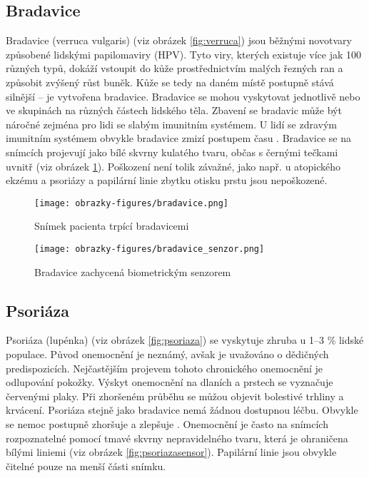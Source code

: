 \subsection{Bradavice}
Bradavice (verruca vulgaris) (viz obrázek \ref{fig:verruca}) jsou běžnými novotvary způsobené lidskými papilomaviry (HPV). Tyto viry, kterých existuje více jak 100 různých typů, dokáží vstoupit do kůže prostřednictvím malých řezných ran a způsobit zvýšený růst buněk. Kůže se tedy na daném místě postupně stává silnější -- je vytvořena bradavice. Bradavice se mohou vyskytovat jednotlivě nebo ve skupinách na různých částech lidského těla. Zbavení se bradavic může být náročné zejména pro lidi se slabým imunitním systémem. U lidí se zdravým imunitním systémem obvykle bradavice zmizí postupem času \cite{WartsOverview}.  Bradavice se na snímcích projevují jako bílé skvrny kulatého tvaru, občas s černými tečkami uvnitř (viz obrázek \ref{fig:verrucasensor}). Poškození není tolik závažné, jako např. u atopického ekzému a psoriázy a papilární linie zbytku otisku prstu jsou nepoškozené. 

\begin{figure}[!htbp]
  \begin{minipage}[b]{0.5\linewidth}
    \centering
    \texttt{[image: obrazky-figures/bradavice.png]}
    \caption{Snímek pacienta trpící bradavicemi \cite{InfluenceSkinDiseases}}
    \label{fig:verruca}
  \end{minipage}
  \hspace{0.5cm}
  \begin{minipage}[b]{0.5\linewidth}
    \centering
    \texttt{[image: obrazky-figures/bradavice\_senzor.png]}
    \caption{Bradavice zachycená biometrickým senzorem \cite{Barotova}}
    \label{fig:verrucasensor}
  \end{minipage}
\end{figure}

\subsection{Psoriáza}
Psoriáza (lupénka) (viz obrázek \ref{fig:psoriaza}) se vyskytuje zhruba u 1--3 \% lidské populace. Původ onemocnění je neznámý, avšak je uvažováno o dědičných predispozicích. Nejčastějším projevem tohoto chronického onemocnění je odlupování pokožky. Výskyt onemocnění na dlaních a prstech se vyznačuje červenými plaky. Při zhoršeném průběhu se můžou objevit bolestivé trhliny a krvácení. Psoriáza stejně jako bradavice nemá žádnou dostupnou léčbu. Obvykle se nemoc postupně zhoršuje a zlepšuje \cite{Psoriasis,InfluenceSkinDiseases}. Onemocnění je často na snímcích rozpoznatelné pomocí tmavé skvrny nepravidelného tvaru, která je ohraničena bílými liniemi (viz obrázek \ref{fig:psoriazasensor}). Papilární linie jsou obvykle čitelné pouze na menší části snímku.

